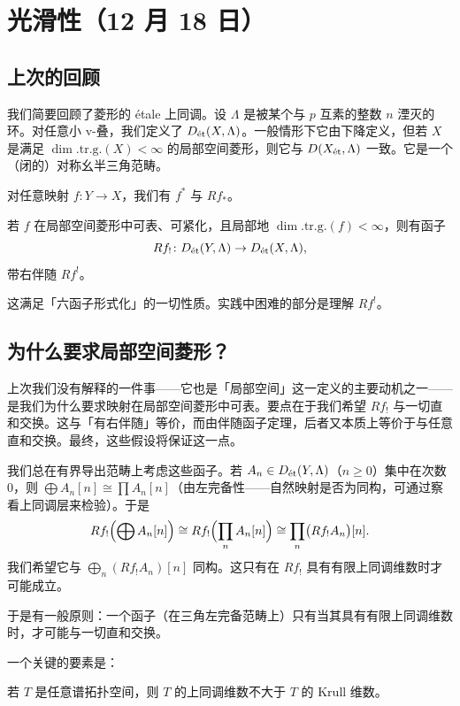 \section[光滑性]{光滑性（12 月 18 日）}


\subsection{上次的回顾}

我们简要回顾了菱形的 étale 上同调。设 $\Lambda$ 是被某个与 $p$ 互素的整数 $n$ 湮灭的环。对任意小 v-叠，我们定义了 $D_{\et}(X,\Lambda)$。一般情形下它由下降定义，但若 $X$ 是满足 $\dim.\mathrm{tr.g.}(X)<\infty$ 的局部空间菱形，则它与 $D(X_{\et},\Lambda)$ 一致。它是一个（闭的）对称幺半三角范畴。

对任意映射 $f\colon Y\to X$，我们有 $f^*$ 与 $Rf_*$。

若 $f$ 在局部空间菱形中可表、可紧化，且局部地 $\dim.\mathrm{tr.g.}(f)<\infty$，则有函子
\[
Rf_!\colon D_{\et}(Y,\Lambda)\to D_{\et}(X,\Lambda),
\]
带右伴随 $Rf^!$。

这满足「六函子形式化」的一切性质。实践中困难的部分是理解 $Rf^!$。

\subsection{为什么要求局部空间菱形？}

上次我们没有解释的一件事——它也是「局部空间」这一定义的主要动机之一——是我们为什么要求映射在局部空间菱形中可表。要点在于我们希望 $Rf_!$ 与一切直和交换。这与「有右伴随」等价，而由伴随函子定理，后者又本质上等价于与任意直和交换。最终，这些假设将保证这一点。

\begin{example}
我们总在有界导出范畴上考虑这些函子。若 $A_n\in D_{\et}(Y,\Lambda)$（$n\ge 0$）集中在次数 $0$，则 $\bigoplus A_n[n]\cong\prod A_n[n]$（由左完备性——自然映射是否为同构，可通过察看上同调层来检验）。于是
\[
Rf_!\Bigl(\bigoplus A_n[n]\Bigr)\cong Rf_!\Bigl(\prod_n A_n[n]\Bigr)\cong\prod_n\bigl(Rf_!A_n\bigr)[n].
\]
我们希望它与 $\bigoplus_n(Rf_!A_n)[n]$ 同构。这只有在 $Rf_!$ 具有有限上同调维数时才可能成立。
\end{example}

于是有一般原则：一个函子（在三角左完备范畴上）只有当其具有有限上同调维数时，才可能与一切直和交换。

一个关键的要素是：

\begin{theorem}[Scheiderer '94]
若 $T$ 是任意谱拓扑空间，则 $T$ 的上同调维数不大于 $T$ 的 Krull 维数。
\end{theorem}

